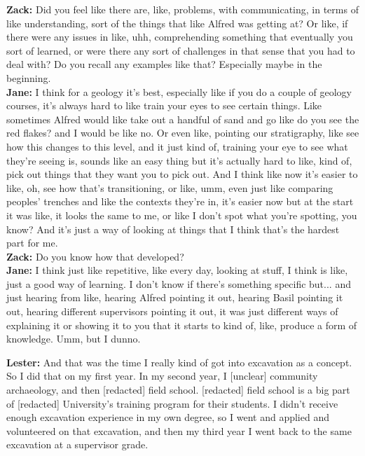 \begin{arefs}
\item\label{A3}
\textbf{Zack:} Did you feel like there are, like, problems, with communicating, in terms of like understanding, sort of the things that like Alfred was getting at? Or like, if there were any issues in like, uhh, comprehending something that eventually you sort of learned, or were there any sort of challenges in that sense that you had to deal with? Do you recall any examples like that? Especially maybe in the beginning.\\
\textbf{Jane:} I think for a geology it's best, especially like if you do a couple of geology courses, it's always hard to like train your eyes to see certain things. Like sometimes Alfred would like take out a handful of sand and go like do you see the red flakes? and I would be like no. Or even like, pointing our stratigraphy, like see how this changes to this level, and it just kind of, training your eye to see what they're seeing is, sounds like an easy thing but it's actually hard to like, kind of, pick out things that they want you to pick out. And I think like now it's easier to like, oh, see how that's transitioning, or like, umm, even just like comparing peoples' trenches and like the contexts they're in, it's easier now but at the start it was like, it looks the same to me, or like I don't spot what you're spotting, you know? And it's just a way of looking at things that I think that's the hardest part for me.\\
\textbf{Zack:} Do you know how that developed?\\
\textbf{Jane:} I think just like repetitive, like every day, looking at stuff, I think is like, just a good way of learning. I don't know if there's something specific but... and just hearing from like, hearing Alfred pointing it out, hearing Basil pointing it out, hearing different supervisors pointing it out, it was just different ways of explaining it or showing it to you that it starts to kind of, like, produce a form of knowledge. Umm, but I dunno.

\item\label{A4}
\textbf{Lester:} And that was the time I really kind of got into excavation as a concept. So I did that on my first year. In my second year, I [unclear] community archaeology, and then [redacted] field school. [redacted] field school is a big part of [redacted] University's training program for their students. I didn't receive enough excavation experience in my own degree, so I went and applied and volunteered on that excavation, and then my third year I went back to the same excavation at a supervisor grade.


\end{arefs}
